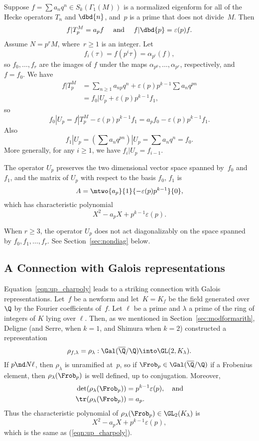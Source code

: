 \documentclass{report}
\begin{document}
Suppose $f=\sum a_n q^n\in S_k(\Gamma_1(M))$ is a normalized eigenform for
all of the Hecke operators $T_n$ and $\dbd{n}$, and~$p$ is a prime
that does not divide~$M$. Then
$$
  f|T_{p}^M=a_p f \quad \text{ and } \quad f|\dbd{p}=\varepsilon(p)f.
$$
Assume $N=p^{r}M$, where~$r\geq 1$ is an integer.
Let
\[
  f_i(\tau)=f(p^i\tau) = \alpha_{p^i}(f),
\]
so $f_0,\ldots,f_r$ are the images of $f$ under the maps
$\alpha_{p^0},\ldots, \alpha_{p^r}$, respectively, and $f=f_0$. We
have
\begin{align*}
f|T_{p}^M & = \sum_{n\geq 1} a_{np}q^n+\varepsilon(p)p^{k-1}\sum a_n{}q^{pn}\\
      & = f_0|U_p + \varepsilon(p)p^{k-1} f_1,
\end{align*}
so
\begin{equation}\label{eqn:f0up}
  f_0|U_p = f|T_{p}^M - \varepsilon(p)p^{k-1}f_1
                 = a_p f_0 - \varepsilon(p)p^{k-1}f_1.
\end{equation}
Also
\[
  f_1|U_p = \left(\sum a_n q^{pn}\right) | U_p = \sum a_n q^n = f_0.
\]
More generally, for any $i\geq 1$, we have $f_i|U_p = f_{i-1}$.

The operator $U_p$ preserves the two dimensional vector space spanned by~$f_0$
and~$f_1$, and the matrix of $U_p$ with respect to the basis $f_0$, $f_1$
is
\[
  A=\mtwo{a_p\hfill}{1}{-\varepsilon(p)p^{k-1}}{0},
\]
which has characteristic polynomial
\begin{equation}\label{eqn:up_charpoly}
  X^2 - a_p X + p^{k-1}\varepsilon(p).
\end{equation}

When $r\geq 3$, the operator $U_p$ does not act diagonalizably on the
space spanned by $f_0, f_1, \ldots, f_r$. See
Section~\ref{sec:nondiag} below.


\subsection{A Connection with Galois representations}
Equation~\eqref{eqn:up_charpoly} leads to a striking connection with
Galois representations.  Let~$f$ be a newform and let~$K=K_f$ be the
field generated over~$\Q$ by the Fourier coefficients of~$f$. Let
$\ell$ be a prime and $\lambda$ a prime of the ring of integers of $K$
lying over $\ell$. Then, as we mentioned in
Section~\ref{sec:modformarith}, Deligne (and Serre, when $k=1$, and
Shimura when $k=2$) constructed a representation
\[
  \rho_{f,\lambda} = \rho_{\lambda}:\Gal(\overline{\Q}/\Q)\into\GL(2,K_{\lambda}).
\]
If $p\nd N\ell$, then $\rho_{\lambda}$ is unramified at~$p$,
so if $\Frob_p\in\Gal(\overline{\Q}/\Q)$ if a Frobenius element,
then $\rho_{\lambda}(\Frob_p)$ is well defined, up to
conjugation.  Moreover,
\begin{align*}
\det(\rho_{\lambda}(\Frob_p)) &= p^{k-1}\varepsilon(p),\quad\text{and} \\
\tr(\rho_{\lambda}(\Frob_p)) & = a_p.
\end{align*}
Thus the characteristic polynomial of
$\rho_{\lambda}(\Frob_p)\in\GL_2(K_{\lambda})$ is
\[
  X^2 - a_p X + p^{k-1}\varepsilon(p),
\]
which is the same as (\ref{eqn:up_charpoly}).
\end{document}
